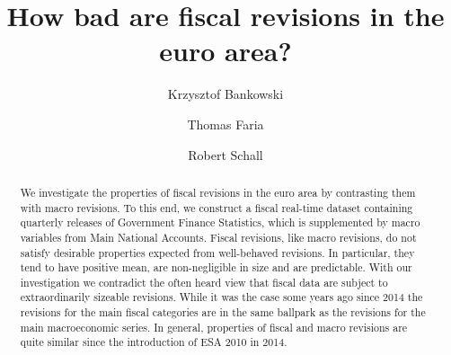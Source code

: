 \documentclass[
  letterpaper,
  authoryear,
  preprint,
  3p]{elsarticle}
\renewcommand*\contentsname{Table of contents}
\newcommand\contentsname{Table of contents}
\begin{document}
\begin{frontmatter}
\title{How bad are fiscal revisions in the euro area?}
\author[1]{Krzysztof Bankowski%
%
}
\author[2]{Thomas Faria%
%
}
\author[3]{Robert Schall%
%
}





        
\begin{abstract}
We investigate the properties of fiscal revisions in the euro area by
contrasting them with macro revisions. To this end, we construct a
fiscal real-time dataset containing quarterly releases of Government
Finance Statistics, which is supplemented by macro variables from Main
National Accounts. Fiscal revisions, like macro revisions, do not
satisfy desirable properties expected from well-behaved revisions. In
particular, they tend to have positive mean, are non-negligible in size
and are predictable. With our investigation we contradict the often
heard view that fiscal data are subject to extraordinarily sizeable
revisions. While it was the case some years ago since 2014 the revisions
for the main fiscal categories are in the same ballpark as the revisions
for the main macroeconomic series. In general, properties of fiscal and
macro revisions are quite similar since the introduction of ESA 2010 in
2014.
\end{abstract}





\end{frontmatter}
    \ifdefined\Shaded\renewenvironment{Shaded}{\begin{tcolorbox}[borderline west={3pt}{0pt}{shadecolor}, breakable, frame hidden, interior hidden, boxrule=0pt, enhanced, sharp corners]}{\end{tcolorbox}}\fi

\renewcommand*\contentsname{Contents}
{
\hypersetup{linkcolor=}
\setcounter{tocdepth}{2}
\tableofcontents
}
\end{document}
